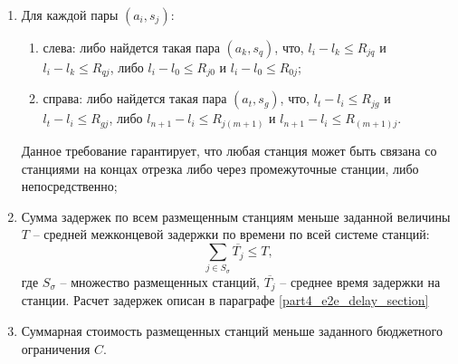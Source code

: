 \begin{enumerate}
  \item  Для каждой пары $(a_i,s_j)$:
      \begin{enumerate}
          \item слева: либо найдется такая пара $(a_k,s_q)$, что, $l_i - l_k \leqslant R_{jq}$  и $l_i - l_k  \leqslant R_{qj}$, либо $l_i-l_0 \leqslant R_{j0}$ и $l_i - l_0 \leqslant R_{0j}$;
          \item справа: либо найдется такая пара $(a_t,s_g)$, что, $l_t-l_i \leqslant R_{jg}$ и $l_t - l_i \leqslant R_{gj}$, либо $l_{n+1}-l_i \leqslant R_{j(m+1)}$ и $l_{n+1}-l_i \leqslant R_{(m+1)j}$. 
\end{enumerate}
Данное требование гарантирует, что любая станция может быть связана со станциями на концах отрезка либо через промежуточные станции, либо непосредственно;
  \item Сумма задержек по всем размещенным станциям меньше заданной величины $T$ – средней межконцевой задержки по времени по всей системе станций:
  \begin{displaymath}
      \label{eq:part3_e2e_delay}
      \sum\limits_{j \in S_\sigma} \overline{T_j} \leqslant T,
  \end{displaymath}
где $S_\sigma$ – множество размещенных станций, $\overline{T_j}$ -- среднее время задержки на станции. Расчет задержек описан в параграфе \cref{part4_e2e_delay_section}
  \item Суммарная стоимость размещенных станций меньше заданного бюджетного ограничения  $C$.
\end{enumerate}


